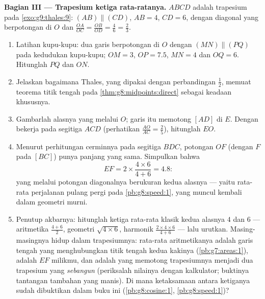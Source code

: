 \begin{problem}
\medskip
\noindent\textbf{Bagian III --- Trapesium ketiga rata-ratanya.}
$ABCD$ adalah trapesium pada \cref{exo:g9:thales:9}:
$(AB) \parallel (CD)$, $AB = 4$, $CD = 6$, dengan diagonal yang
berpotongan di $O$ dan $\frac{OA}{OC} = \frac{OB}{OD} = \frac{4}{6} =
\frac23$.
\begin{enumerate}[resume]
  \item Latihan kupu-kupu: dua garis berpotongan di $O$ dengan
        $(MN) \parallel (PQ)$ pada kedudukan kupu-kupu; $OM = 3$,
        $OP = 7.5$, $MN = 4$ dan $OQ = 6$. Hitunglah $PQ$ dan
        $ON$.
  \item Jelaskan bagaimana Thales, yang dipakai dengan perbandingan
        $\frac12$, memuat teorema titik tengah pada
        \cref{thm:g8:midpoints:direct} sebagai keadaan khususnya.
  \item Gambarlah  alasnya yang melalui $O$; garis itu
        memotong $[AD]$ di $E$. Dengan bekerja pada segitiga $ACD$
        (perhatikan $\frac{AO}{AC} = \frac25$), hitunglah $EO$.
  \item Menurut perhitungan cerminnya pada segitiga $BDC$, potongan
        $OF$ (dengan $F$ pada $[BC]$) punya panjang yang sama.
        Simpulkan bahwa
        \[
        EF = 2 \times \frac{4 \times 6}{4 + 6} = 4.8 :
        \]
         yang melalui potongan diagonalnya berukuran
        \emph{} kedua alasnya --- yaitu rata-rata
        perjalanan pulang pergi pada \cref{pb:g8:speed:1}, yang
        muncul kembali dalam geometri murni.
  \item Penutup akbarnya: hitunglah ketiga rata-rata klasik
        kedua alasnya $4$ dan $6$ --- aritmetika
        $\frac{4+6}{2}$, geometri $\sqrt{4 \times 6}$, harmonik
        $\frac{2 \times 4 \times 6}{4 + 6}$ --- lalu urutkan.
        Masing-masingnya hidup dalam trapesiumnya: rata-rata
        aritmetikanya adalah garis tengah yang menghubungkan titik
        tengah kedua kakinya (\cref{pb:g7:areas:1}),  adalah  $EF$ milikmu, dan  adalah 
        yang memotong trapesiumnya menjadi dua trapesium yang
        \emph{sebangun} (periksalah nilainya dengan kalkulator;
        buktinya tantangan tambahan yang manis). Di mana
        ketaksamaan antara ketiganya sudah dibuktikan dalam buku ini
        (\cref{pb:g8:cosine:1}, \cref{pb:g8:speed:1})?

\end{enumerate}
\end{problem}
